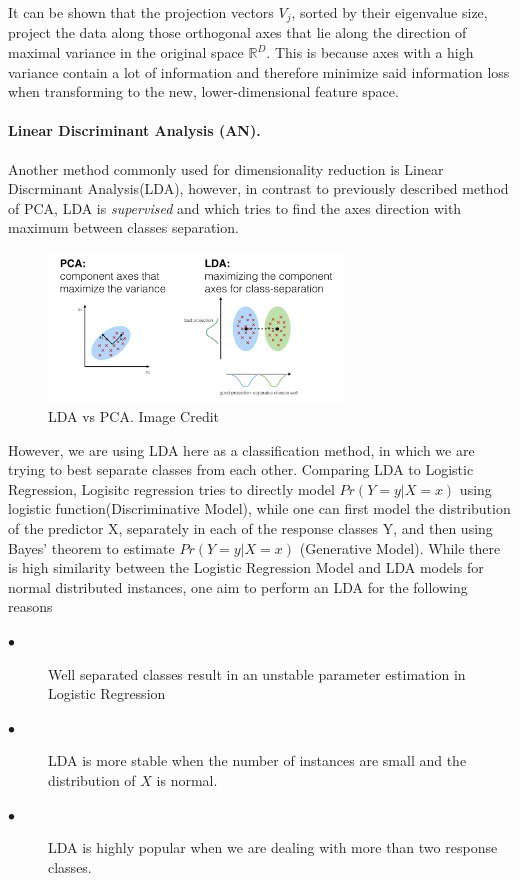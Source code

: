 \documentclass[12pt, a4paper]{scrartcl}
\begin{document}
It can be shown that the projection vectors $V_j$, sorted by their eigenvalue size, project the data along those orthogonal axes that lie along the direction of maximal variance in the original space $\mathbb{R}^D$. This is because axes with a high variance contain a lot of information and therefore minimize said information loss when transforming to the new, lower-dimensional feature space.
\paragraph{Linear Discriminant Analysis (AN).} Another method commonly used for dimensionality reduction is Linear Discrminant Analysis(LDA), however, in contrast to previously described method of PCA, LDA is \emph{supervised} and which tries to find the axes direction with maximum between classes separation.

\begin{figure}
	\centering
	\includegraphics[width=0.7\textwidth]{LDAvsPCA}
	\caption{LDA vs PCA. Image Credit \citep{raschka2014linear}}
	\label{fig:LDAvsPCA}
\end{figure}

However, we are using LDA here as a classification method, in which we are trying to best separate classes from each other. Comparing LDA to Logistic Regression, Logisitc regression tries to directly model $Pr(Y = y | X = x)$ using logistic function(Discriminative Model), while one can first model the distribution of the predictor X, separately in each of the response classes Y, and then using Bayes' theorem to estimate  $Pr(Y = y | X = x)$ (Generative Model). While there is high similarity between the Logistic Regression Model and LDA models for normal distributed instances, one aim to perform an LDA for the following reasons\cite{James:2014:ISL:2517747}

\begin{description}
  \item[$\bullet$] Well separated classes result in an unstable parameter estimation in Logistic Regression
  \item[$\bullet$] LDA is more stable when the number of instances are small and the distribution of $X$ is normal.
  \item[$\bullet$] LDA is highly popular when we are dealing with more than two response classes.
\end{description}
\end{document}
